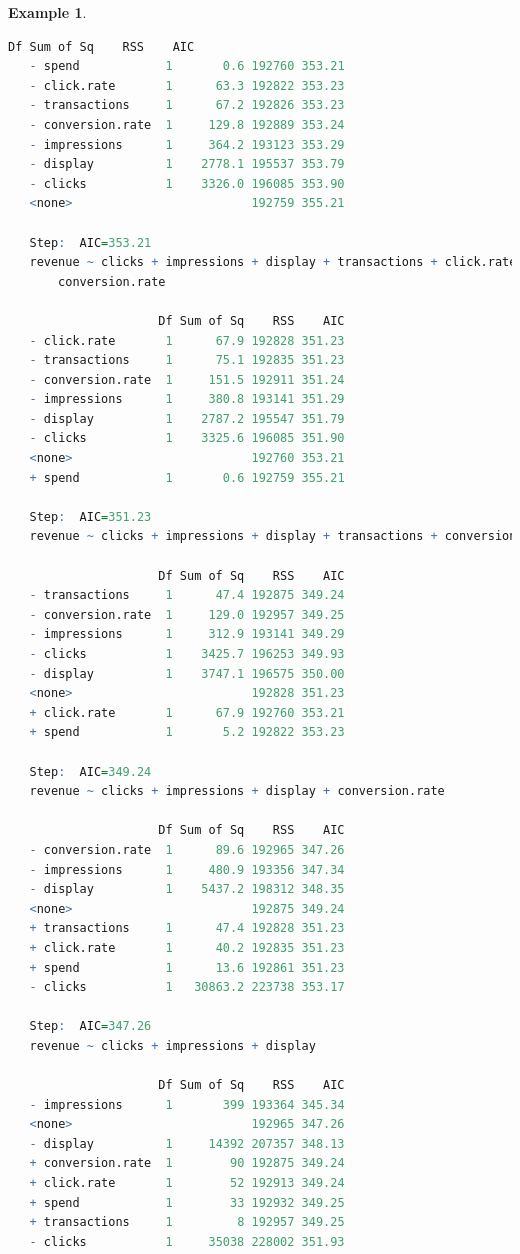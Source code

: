 \documentclass[
]{book}
\theoremstyle{definition}
\theoremstyle{definition}
\newtheorem{example}{Example}[chapter]
\theoremstyle{definition}
\theoremstyle{definition}
\theoremstyle{remark}
\begin{document}
\begin{example}
\begin{lstlisting}[language=R]
                     Df Sum of Sq    RSS    AIC
   - spend            1       0.6 192760 353.21
   - click.rate       1      63.3 192822 353.23
   - transactions     1      67.2 192826 353.23
   - conversion.rate  1     129.8 192889 353.24
   - impressions      1     364.2 193123 353.29
   - display          1    2778.1 195537 353.79
   - clicks           1    3326.0 196085 353.90
   <none>                         192759 355.21
   
   Step:  AIC=353.21
   revenue ~ clicks + impressions + display + transactions + click.rate + 
       conversion.rate
   
                     Df Sum of Sq    RSS    AIC
   - click.rate       1      67.9 192828 351.23
   - transactions     1      75.1 192835 351.23
   - conversion.rate  1     151.5 192911 351.24
   - impressions      1     380.8 193141 351.29
   - display          1    2787.2 195547 351.79
   - clicks           1    3325.6 196085 351.90
   <none>                         192760 353.21
   + spend            1       0.6 192759 355.21
   
   Step:  AIC=351.23
   revenue ~ clicks + impressions + display + transactions + conversion.rate
   
                     Df Sum of Sq    RSS    AIC
   - transactions     1      47.4 192875 349.24
   - conversion.rate  1     129.0 192957 349.25
   - impressions      1     312.9 193141 349.29
   - clicks           1    3425.7 196253 349.93
   - display          1    3747.1 196575 350.00
   <none>                         192828 351.23
   + click.rate       1      67.9 192760 353.21
   + spend            1       5.2 192822 353.23
   
   Step:  AIC=349.24
   revenue ~ clicks + impressions + display + conversion.rate
   
                     Df Sum of Sq    RSS    AIC
   - conversion.rate  1      89.6 192965 347.26
   - impressions      1     480.9 193356 347.34
   - display          1    5437.2 198312 348.35
   <none>                         192875 349.24
   + transactions     1      47.4 192828 351.23
   + click.rate       1      40.2 192835 351.23
   + spend            1      13.6 192861 351.23
   - clicks           1   30863.2 223738 353.17
   
   Step:  AIC=347.26
   revenue ~ clicks + impressions + display
   
                     Df Sum of Sq    RSS    AIC
   - impressions      1       399 193364 345.34
   <none>                         192965 347.26
   - display          1     14392 207357 348.13
   + conversion.rate  1        90 192875 349.24
   + click.rate       1        52 192913 349.24
   + spend            1        33 192932 349.25
   + transactions     1         8 192957 349.25
   - clicks           1     35038 228002 351.93
   

\end{lstlisting}
\end{example}
\end{document}
